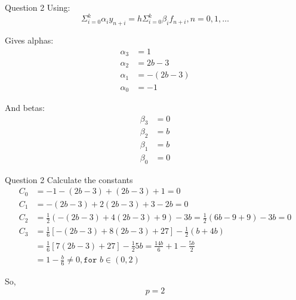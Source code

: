 \documentclass{beamer}
\begin{document}
\begin{frame}{Question 2}
Using:\\
$$\Sigma_{i=0}^{k}\alpha_iy_{n+i} = h \Sigma_{i=0}^{k} \beta_i f_{n+i}, n=0,1,\ldots$$

Gives alphas:
\begin{align*}
\alpha_3 &= 1\\ 
\alpha_2 &= 2b - 3\\
\alpha_1 &= -(2b - 3)\\
\alpha_0 &= -1
\end{align*}

And betas:
\begin{align*}
\beta_3 &= 0\\
\beta_2 &= b\\
\beta_1 &= b\\
\beta_0 &= 0
\end{align*}

\end{frame}

\begin{frame}{Question 2}
Calculate the constants
\begin{align*}
C_0 &= -1 - (2b - 3) + (2b - 3) + 1 = 0\\
C_1 &= -(2b - 3) + 2(2b-3) + 3 - 2b = 0\\
C_2 &= \frac{1}{2}(-(2b-3) + 4(2b-3) + 9) - 3b = \frac{1}{2} (6b - 9 + 9) - 3b = 0\\
C_3 &= \frac{1}{6}[-(2b-3) + 8(2b-3) + 27] - \frac{1}{2}(b+4b)\\
    &= \frac{1}{6}[7(2b-3) + 27] - \frac{1}{2}5b = \frac{14b}{6} + 1 - \frac{5b}{2}\\
    &= 1 - \frac{b}{6} \ne 0, \texttt{for } b \in (0,2)
\end{align*}

So,
$$p = 2$$

\end{frame}
\end{document}

